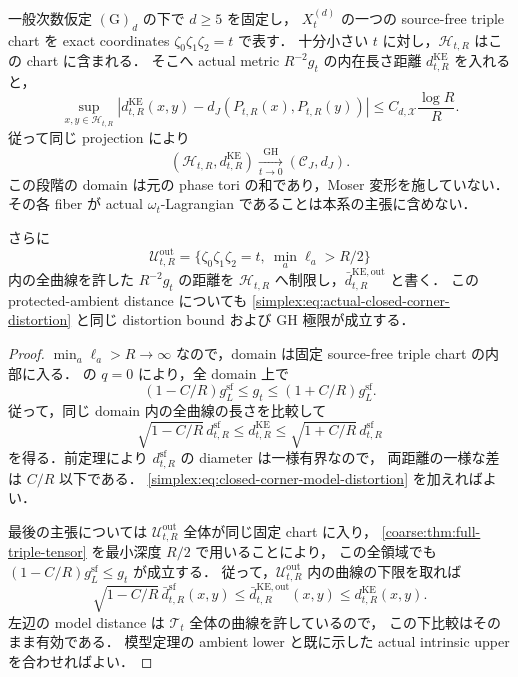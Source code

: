 \begin{corollary}
\label{simplex:cor:actual-closed-corner-metric}
一般次数仮定 $\mathrm{(G)}_d$ の下で $d\ge5$ を固定し，
$X_t^{(d)}$ の一つの source-free triple chart を exact coordinates
$\zeta_0\zeta_1\zeta_2=t$ で表す．
十分小さい $t$ に対し，$\mathscr H_{t,R}$ はこの chart に含まれる．
そこへ actual metric $R^{-2}g_t$ の内在長さ距離
$d_{t,R}^{\mathrm{KE}}$ を入れると，
\begin{equation}\label{simplex:eq:actual-closed-corner-distortion}
 \sup_{x,y\in\mathscr H_{t,R}}
 \left|d_{t,R}^{\mathrm{KE}}(x,y)
       -d_J(P_{t,R}(x),P_{t,R}(y))\right|
 \le C_{d,\mathcal X}\frac{\log R}R .
\end{equation}
従って同じ projection により
\[
 (\mathscr H_{t,R},d_{t,R}^{\mathrm{KE}})
 \xrightarrow[t\to0]{\mathrm{GH}}(\mathcal C_J,d_J).
\]
この段階の domain は元の phase tori の和であり，Moser 変形を施していない．
その各 fiber が actual $\omega_t$-Lagrangian であることは本系の主張に含めない．

さらに
\[
 \mathscr U_{t,R}^{\mathrm{out}}
   =\{\zeta_0\zeta_1\zeta_2=t,\ \min_a\ell_a>R/2\}
\]
内の全曲線を許した $R^{-2}g_t$ の距離を
$\mathscr H_{t,R}$ へ制限し，$\bar d_{t,R}^{\mathrm{KE,out}}$ と書く．
この protected-ambient distance についても
\eqref{simplex:eq:actual-closed-corner-distortion} と同じ distortion bound
および GH 極限が成立する．
\end{corollary}

\begin{proof}
$\min_a\ell_a>R\to\infty$ なので，domain は固定 source-free triple chart の内部に入る．
 の $q=0$ により，全 domain 上で
\[
 (1-C/R)g_L^{\mathrm{sf}}\le g_t
                  \le(1+C/R)g_L^{\mathrm{sf}} .
\]
従って，同じ domain 内の全曲線の長さを比較して
\[
 \sqrt{1-C/R}\,d_{t,R}^{\mathrm{sf}}
 \le d_{t,R}^{\mathrm{KE}}
 \le\sqrt{1+C/R}\,d_{t,R}^{\mathrm{sf}}
\]
を得る．前定理により $d_{t,R}^{\mathrm{sf}}$ の diameter は一様有界なので，
両距離の一様な差は $C/R$ 以下である．
\eqref{simplex:eq:closed-corner-model-distortion} を加えればよい．

最後の主張については $\mathscr U_{t,R}^{\mathrm{out}}$ 全体が同じ固定 chart に入り，
\cref{coarse:thm:full-triple-tensor} を最小深度 $R/2$ で用いることにより，
この全領域でも $(1-C/R)g_L^{\mathrm{sf}}\le g_t$ が成立する．
従って，$\mathscr U_{t,R}^{\mathrm{out}}$ 内の曲線の下限を取れば
\[
 \sqrt{1-C/R}\,\bar d_{t,R}^{\mathrm{sf}}(x,y)
 \le\bar d_{t,R}^{\mathrm{KE,out}}(x,y)
 \le d_{t,R}^{\mathrm{KE}}(x,y).
\]
左辺の model distance は $\mathscr T_t$ 全体の曲線を許しているので，
この下比較はそのまま有効である．
模型定理の ambient lower と既に示した actual intrinsic upper を合わせればよい．
\end{proof}


